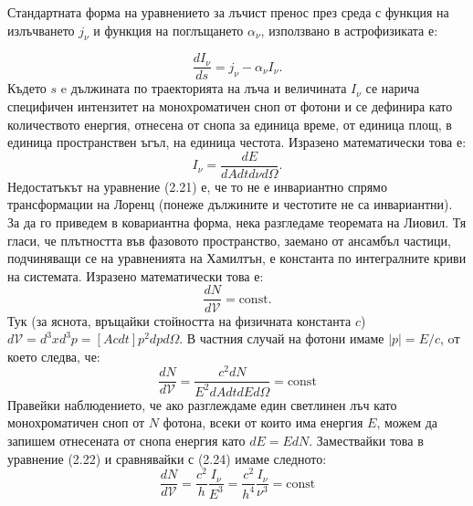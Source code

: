 Стандартната форма на уравнението за лъчист пренос през среда с функция на излъчването $j_\nu$ и функция на поглъщането $\alpha_\nu$, използвано в астрофизиката е:

\begin{equation}
	\frac{dI_\nu}{ds} = j_\nu - \alpha_\nu I_\nu.
\end{equation}
Където $s$ e дължината по траекторията на лъча и величината $I_\nu$ се нарича специфичен интензитет на монохроматичен сноп от фотони и се дефинира като количеството енергия, отнесена от снопа за единица време, от единица площ, в единица пространствен ъгъл, на единица честота. Изразено математически това е:
\begin{equation}
	I_\nu = \frac{dE}{dAdtd\nu d\Omega}.
\end{equation}
Недостатъкът на уравнение (2.21) е, че то не е инвариантно спрямо трансформации на Лоренц (понеже дължините и честотите не са инвариантни). За да го приведем в ковариантна форма, нека разгледаме теоремата на Лиовил. Тя гласи, че плътността във фазовото пространство, заемано от ансамбъл частици, подчиняващи се на уравненията на Хамилтън, е константа по интегралните криви на системата. Изразено математически това е:
\begin{equation}
	\frac{dN}{d\mathcal{V}} = \text{const}.
\end{equation}
Тук (за яснота, връщайки стойността на физичната константа $c$) $d\mathcal{V} = d^3x d^3p = \left[A cdt\right] p^2dpd\Omega$. В частния случай на фотони имаме $|p| = E / c$, oт което следва, че:
\begin{equation}
	\frac{dN}{d\mathcal{V}} = \frac{c^2dN}{E^2dAdtdEd\Omega} = \text{const}
\end{equation}
Правейки наблюдението, че ако разглеждаме един светлинен лъч като монохроматичен сноп от $N$ фотона, всеки от които има енергия $E$, можем да запишем отнесената от снопа енергия като $dE = EdN$. Замествайки това в уравнение (2.22) и сравнявайки с (2.24) имаме следното:
\begin{equation}
	\frac{dN}{d\mathcal{V}} = \frac{c^2}{h}\frac{I_\nu}{E^3} = \frac{c^2}{h^4}\frac{I_\nu}{\nu^3} = \text{const}
\end{equation}

